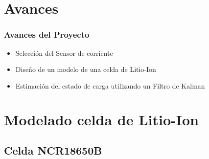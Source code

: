 \documentclass[10pt]{beamer}
\theoremstyle{remark}
\theoremstyle{definition}
\begin{document}
\section{Avances}
\begin{frame}[allowframebreaks]
\frametitle{Avances del Proyecto}
	\begin{itemize}
	  \item Selección del Sensor de corriente
	  \item Diseño de un modelo de una celda de Litio-Ion
	  \item Estimación del estado de carga utilizando un Filtro de Kalman
	\end{itemize}
\end{frame}

\section{Modelado celda de Litio-Ion}

\subsection{Celda NCR18650B }
\end{document}

